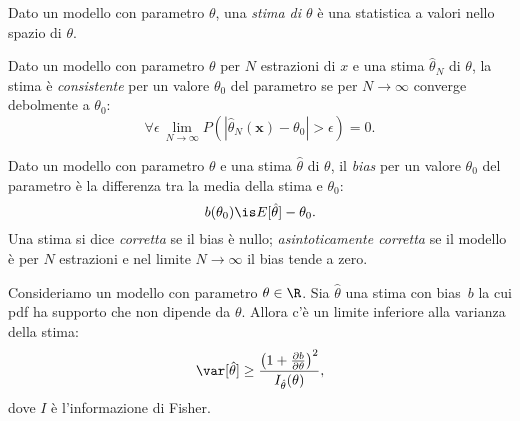 
\begin{definition}[Stima]
	Dato un modello con parametro $\theta$,
	una \emph{stima di $\theta$} è una statistica a valori nello spazio di $\theta$.
\end{definition}

\begin{definition}[Consistenza]
	Dato un modello con parametro $\theta$ per $N$ estrazioni di $x$
	e una stima $\hat\theta_N$ di $\theta$,
	la stima è \emph{consistente} per un valore $\theta_0$ del parametro
	se per $N\to\infty$ converge debolmente a $\theta_0$:
	\begin{equation*}
		\forall\epsilon\, \lim_{N\to\infty} P(|\hat\theta_N(\mathbf x)-\theta_0| > \epsilon) = 0.
	\end{equation*}
\end{definition}

\begin{definition}[Bias]
	Dato un modello con parametro $\theta$ e una stima $\hat\theta$ di $\theta$,
	il \emph{bias} per un valore $\theta_0$ del parametro è la differenza tra la media della stima e $\theta_0$:
	\begin{equation*}
		b(\theta_0) \is E[\hat\theta] - \theta_0.
	\end{equation*}
	Una stima si dice \emph{corretta} se il bias è nullo;
	\emph{asintoticamente corretta} se il modello è per $N$ estrazioni
	e nel limite $N\to\infty$ il bias tende a zero.
\end{definition}

\begin{theorem}
	\label{th:cramerrao}
	Consideriamo un modello con parametro $\theta\in\R$.
	Sia $\hat\theta$ una stima con bias~$b$
	la cui pdf ha supporto che non dipende da $\theta$.
	Allora c'è un limite inferiore alla varianza della stima:
	\begin{equation*}
		\var[\hat\theta] \ge \frac{\left( 1 + \frac{\partial b}{\partial\theta} \right)^2}{I_{\hat\theta}(\theta)},
	\end{equation*}
	dove $I$ è l'informazione di Fisher.
\end{theorem}

